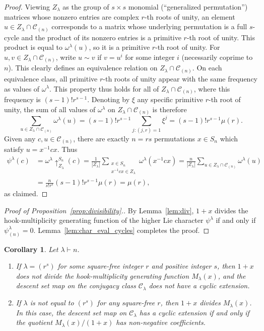 \documentclass[10pt]{article}
\newtheorem{corollary}[theorem]{Corollary}
\theoremstyle{definition}
\newcommand{\C}{\mathcal C}
\begin{document}
\begin{proof}
    Viewing $Z_\lambda$ as the group of $s \times s$ monomial (``generalized permutation'') matrices whose nonzero entries are complex $r$-th roots of unity, an element $u \in Z_\lambda \cap \C_{(n)}$ corresponds to a matrix whose underlying permutation is a full $s$-cycle and the product of its nonzero entries is a primitive $r$-th root of unity.
    This product is equal to $\omega^\lambda(u)$, so it is a primitive $r$-th root of unity.
    For $u, v \in Z_\lambda \cap \C_{(n)}$, write $u \sim v$ if $v = u^i$ for some integer $i$ (necessarily coprime to $n$). This clearly defines an equivalence relation on $Z_\lambda \cap \C_{(n)}$. On each equivalence class, all primitive $r$-th roots of unity appear with the same frequency as values of $\omega^\lambda$. This property thus holds for all of $Z_\lambda \cap \C_{(n)}$, where this frequency is $(s-1)!r^{s-1}$. Denoting by $\xi$ any specific primitive $r$-th root of unity, the sum of all values of $\omega^\lambda$ on $Z_\lambda \cap \C_{(n)}$ is therefore
    \[
        \sum_{u\in Z_\lambda\cap\C_{(n)}} \omega^\lambda(u)
        = (s-1)! r^{s-1} \sum_{j:(j,r)=1} \xi^j
        = (s-1)! r^{s-1} \mu(r).
    \]
    Given any $c,u \in \C_{(n)}$, there are exactly $n=rs$ permutations $x \in S_n$ which satisfy $u=x^{-1}cx$.
    Thus
    \begin{align*}
        \psi^\lambda(c)
        &= \omega^\lambda\uparrow_{Z_\lambda}^{S_n}(c)
        = \frac{1}{|Z_\lambda|}\sum_{\substack{x \in S_n \\ x^{-1}cx \in Z_\lambda}} \omega^\lambda(x^{-1}cx)
        = \frac{n}{|Z_\lambda|}\sum_{u \in Z_\lambda\cap\C_{(n)}} \omega^\lambda(u) \\
        &= \frac{n}{s!r^s} (s-1)! r^{s-1} \mu(r)
        = \mu(r), 
    \end{align*}
    as claimed.
\end{proof}

\begin{proof}[Proof of Proposition~\ref{prop:divisibility}.]
	By Lemma~\ref{lem:div}, 
	$1+x$ divides the hook-multiplicity generating function of the higher Lie character $\psi^\lambda$ 
    if and only if $\psi^\lambda_{(n)}=0$.
    Lemma~\ref{lem:char_eval_cycles} completes the proof.
\end{proof}

\begin{corollary}\label{cor:only if}
    Let $\lambda \vdash n$.
    \begin{enumerate}
    \item
        If $\lambda = (r^s)$ for some square-free integer $r$ and positive integer $s$, then $1+x$ does not divide the hook-multiplicity generating function $M_\lambda(x)$, and the descent set map on the conjugacy class $\C_\lambda$ does not have a cyclic extension.
    \item 
        If $\lambda$ is not equal to $(r^s)$ for any square-free $r$, then $1+x$ divides $M_\lambda(x)$. 
        In this case, the descent set map on 
        $\C_\lambda$ has a cyclic extension if and only if 
        the quotient $M_\lambda(x)/(1+x)$ has non-negative coefficients.
    \end{enumerate}
\end{corollary}
\end{document}

